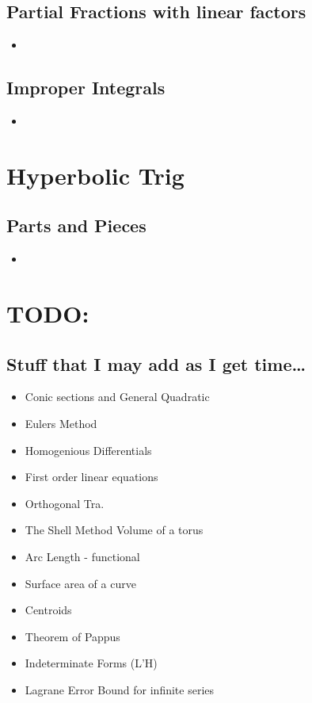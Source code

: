 \documentclass{article}
\begin{document}
    \subsection*{\color{BrickRed}Partial Fractions with linear
    factors}
      \begin{itemize}
        \item
      \end{itemize}
    \subsection*{\color{BrickRed}Improper Integrals}
      \begin{itemize}
        \item
      \end{itemize}
  \newpage
  \section*{\color{Gray}Hyperbolic Trig}
    \subsection*{\color{BrickRed}Parts and Pieces}
      \begin{itemize}
        \item
      \end{itemize}
  \newpage
  \section*{\color{Gray}TODO:}
    \subsection*{\color{BrickRed}Stuff that I may add as I get
    time\ldots}
    \begin{itemize}
      \item Conic sections and General Quadratic
      \item Eulers Method
      \item Homogenious Differentials
      \item First order linear equations
      \item Orthogonal Tra.
      \item The Shell Method
        \subitem Volume of a torus
      \item Arc Length - functional
      \item Surface area of a curve
      \item Centroids
      \item Theorem of Pappus
      \item Indeterminate Forms (L'H)
      \item Lagrane Error Bound for infinite series
    \end{itemize}
\end{document}
